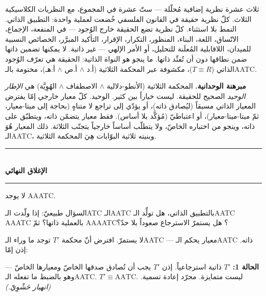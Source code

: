 \documentclass[10pt, openany, oneside]{book}
\renewcommand{\normalsize}{\fontsize{10}{13}\selectfont}
\begin{document}
\vspace{0.8em}

\noindent ثلاث عشرة نظرية إضافية مُحلّلة --- ستّ عشرة في المجموع، مع النظريات الكلاسيكية الثلاث. كلّ نظرية حقيقة في القانون الفلسفي خُضعت لعملية واحدة: التطبيق الذاتي. النمط بلا استثناء. كلّ نظرية تضع الحقيقة خارج الوُجود --- في المنفعة، الإجماع، الاتّساق، اللغة، البناء، المنظور، التكرار، الإقرار، التأكيد المبرَّر، الخصائص النسبية للميدان، اللاقابلية المُعلَنة للتحليل، أو الأمر الإلهي --- غير ذاتية. لا يمكنها تضمين ذاتها ضمن نطاقها دون أن تُفنِّد ذاتها. ما ينجو هو النواة الذاتية: الحقيقة هي تعرّف الوُجود الذاتي ($T \equiv R$)، مكشوفة عبر المحكمة الثلاثية (أ.د $\wedge$ أ.ص $\wedge$ أ.هـ)، مختومة بالـAATC.

\textbf{مبرهنة الوحدانية.} المحكمة الثلاثية (الأنطو-دلالية $\wedge$ الاصطفاف $\wedge$ الهُوِيَّة) هي \textit{الإطار الوحيد} الصحيح للحقيقة. ليست خياراً بين كثير. الوحيد. كلّ معيار خارجي إمّا يفترض المعيار الذاتي مسبقاً (ليُصادق ذاته)، أو يؤدّي إلى تراجع لا متناهٍ (بحاجة إلى ميتا-معيار، ثمّ ميتا-ميتا-معيار)، أو اعتباطيّ (مُؤكَّد بلا أساس). فقط معيار يتضمّن ذاته، ويتطبّق على ذاته، وينجو من اختباره الخاصّ، ولا يتطلّب أساساً خارجياً يتجنّب الثلاثة. ذلك المعيار هُوَ الـAATC، وبنيته ثلاثية البوّابات هِيَ المحكمة الثلاثية.

\vspace{1.5em}


\begin{center}
    \rule{0.3\textwidth}{0.4pt}\\[0.5em]
    {\normalsize\bfseries الإغلاق النهائي}\\[0.3em]
    \rule{0.3\textwidth}{0.4pt}
\end{center}

\vspace{1em}

\noindent لا يوجد AAATC.

السؤال طبيعيّ: إذا ولّدت الـATC الـAATC بالتطبيق الذاتي، هل تولِّد الـAATC AAATC بالعملية ذاتها؟ ثمّ AAAATC؟ هل يستمرّ الاسترجاع صعوداً بلا حدّ؟

لا يستمرّ. افترض أنّ محكمة $T'$ توجد ما وراء الـAATC --- معيار يحكم الـAATC ذاته. إذن إمّا:

\textbf{الحالة 1:} $T'$ ذاتية استرجاعياً. إذن $T'$ يجب أن تُصادق صدقها الخاصّ ومعيارها الخاصّ --- وهو بالضبط ما تفعله الـAATC. $T' \equiv \text{AATC}$. ليست متمايزة. مجرّد إعادة تسمية. \textit{(انهيار حَشْوِيّ.)}
\end{document}
